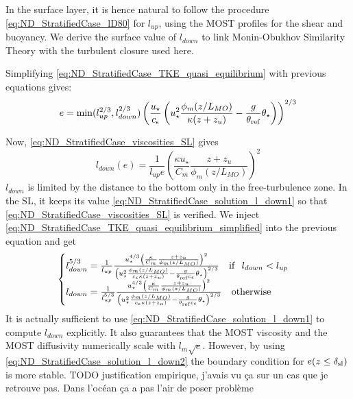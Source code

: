 In the surface layer, it is hence natural to follow the
procedure \eqref{eq:ND_StratifiedCase_lD80} for $l_{up}$,
using the MOST profiles for the shear and buoyancy.
We derive the surface value of $l_{down}$ to link Monin-Obukhov
Similarity Theory with the turbulent closure used here.
\par
Simplifying \eqref{eq:ND_StratifiedCase_TKE_quasi_equilibrium}
with previous equations gives:
\begin{equation}
	\label{eq:ND_StratifiedCase_TKE_quasi_equilibrium_simplified}
	e = \min(l_{up}^{2/3}, l_{down}^{2/3})\left(
	\frac{u_\star}{c_\epsilon} 
	\left({u}_\star^2
	\frac{\phi_m(z/L_{MO})}{\kappa (z+z_{u})}
	- \frac{g}{\theta_{\rm ref}}\theta_\star
	\right)
	\right)^{2/3}
\end{equation}

Now, \eqref{eq:ND_StratifiedCase_viscosities_SL} gives
\begin{equation}
	\label{eq:ND_StratifiedCase_solution_l_down1}
	l_{down}(e) = \frac{1}{l_{up} e} \left(
	\frac{\kappa u_\star}{C_m}
	\frac{z + z_{u}}{\phi_m(z/L_{MO})}
\right)^2
\end{equation}
$l_{down}$ is limited by the distance to the bottom only
in the free-turbulence zone. In the SL, it keeps its value
\eqref{eq:ND_StratifiedCase_solution_l_down1}
so that \eqref{eq:ND_StratifiedCase_viscosities_SL} is
verified.
We inject \eqref{eq:ND_StratifiedCase_TKE_quasi_equilibrium_simplified}
into the previous equation and get
\begin{equation}
	\label{eq:ND_StratifiedCase_solution_l_down2}
	\begin{cases}
	l_{down}^{5/3} = \frac{1}{l_{up}} \frac{u_\star^{4/3}\left(
	\frac{\kappa}{C_m}
	\frac{z + z_{u}}{\phi_m(z/L_{MO})}
	\right)^2}{
	\left({u}_\star^2
	\frac{\phi_m(z/L_{MO})}{c_\epsilon\kappa (z+z_{u})}
	- \frac{g}{\theta_{\rm ref}c_\epsilon}\theta_\star
	\right)^{2/3}} ~~~ {\rm if } ~~l_{down} < l_{up}\\
	l_{down} = \frac{1}{l_{up}^{5/3}} \frac{u_\star^{4/3}\left(
	\frac{\kappa}{C_m}
	\frac{z + z_{u}}{\phi_m(z/L_{MO})}
	\right)^2}{
	\left({u}_\star^2
	\frac{\phi_m(z/L_{MO})}{c_\epsilon\kappa (z+z_{u})}
	- \frac{g}{\theta_{\rm ref}c_\epsilon}\theta_\star
	\right)^{2/3}} ~~~ {\rm otherwise}\\
	\end{cases}
\end{equation}
It is actually sufficient to use
\eqref{eq:ND_StratifiedCase_solution_l_down1}
to compute $l_{down}$ explicitly. It also guarantees that
the MOST viscosity and the MOST diffusivity numerically
scale with $l_m\sqrt{e}$.
However, by using \eqref{eq:ND_StratifiedCase_solution_l_down2}
the boundary condition for $e(z \leq \delta_{\rm sl})$ is more
stable. {\color{red} TODO justification empirique, j'avais
vu ça sur un cas que je retrouve pas. Dans l'océan ça
a pas l'air de poser problème}
